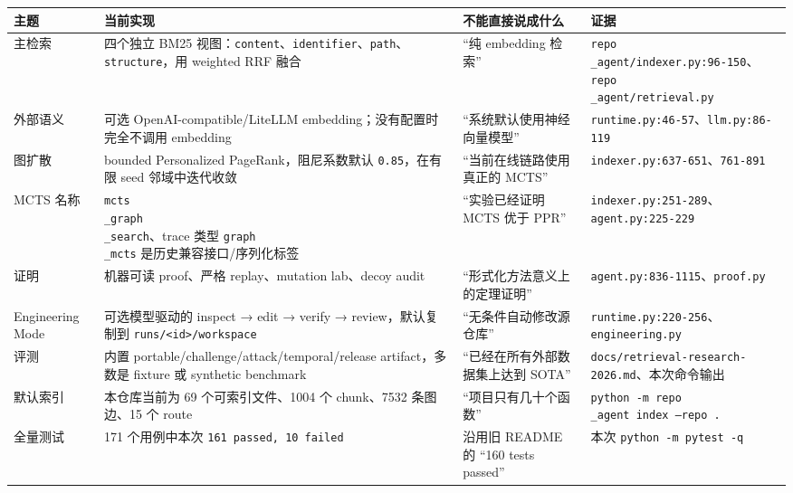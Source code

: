 \documentclass[UTF8,12pt,openany]{ctexbook}
\begin{document}
\begin{center}
\small
\begin{longtable}{|p{}|p{}|p{}|p{}|}
\toprule
主题 & 当前实现 & 不能直接说成什么 & 证据 \\
\midrule
主检索 & 四个独立 BM25 视图：\texttt{content}、\texttt{identifier}、\texttt{path}、\texttt{structure}，用 weighted RRF 融合 & “纯 embedding 检索” & \texttt{repo\\_agent/indexer.py:96-150}、\texttt{repo\\_agent/retrieval.py} \\
外部语义 & 可选 OpenAI-compatible/LiteLLM embedding；没有配置时完全不调用 embedding & “系统默认使用神经向量模型” & \texttt{runtime.py:46-57}、\texttt{llm.py:86-119} \\
图扩散 & bounded Personalized PageRank，阻尼系数默认 \texttt{0.85}，在有限 seed 邻域中迭代收敛 & “当前在线链路使用真正的 MCTS” & \texttt{indexer.py:637-651}、\texttt{761-891} \\
MCTS 名称 & \texttt{mcts\\_graph\\_search}、trace 类型 \texttt{graph\\_mcts} 是历史兼容接口/序列化标签 & “实验已经证明 MCTS 优于 PPR” & \texttt{indexer.py:251-289}、\texttt{agent.py:225-229} \\
证明 & 机器可读 proof、严格 replay、mutation lab、decoy audit & “形式化方法意义上的定理证明” & \texttt{agent.py:836-1115}、\texttt{proof.py} \\
Engineering Mode & 可选模型驱动的 inspect → edit → verify → review，默认复制到 \texttt{runs/<id>/workspace} & “无条件自动修改源仓库” & \texttt{runtime.py:220-256}、\texttt{engineering.py} \\
评测 & 内置 portable/challenge/attack/temporal/release artifact，多数是 fixture 或 synthetic benchmark & “已经在所有外部数据集上达到 SOTA” & \texttt{docs/retrieval-research-2026.md}、本次命令输出 \\
默认索引 & 本仓库当前为 69 个可索引文件、1004 个 chunk、7532 条图边、15 个 route & “项目只有几十个函数” & \texttt{python -m repo\\_agent index --repo .} \\
全量测试 & 171 个用例中本次 \texttt{161 passed, 10 failed} & 沿用旧 README 的 “160 tests passed” & 本次 \texttt{python -m pytest -q} \\
\bottomrule
\end{longtable}
\end{center}
\end{document}
